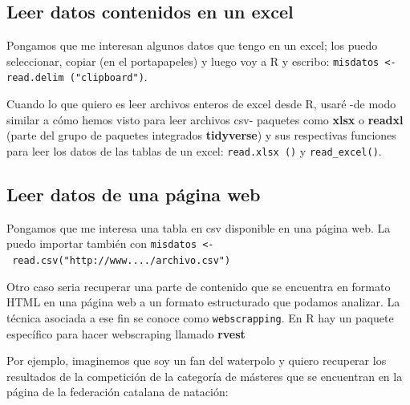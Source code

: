 \documentclass[]{book}
\newenvironment{Shaded}{\begin{snugshade}}{\end{snugshade}}
\newcommand{\KeywordTok}[1]{\textcolor[rgb]{0.13,0.29,0.53}{\textbf{{#1}}}}
\newcommand{\DecValTok}[1]{\textcolor[rgb]{0.00,0.00,0.81}{{#1}}}
\newcommand{\StringTok}[1]{\textcolor[rgb]{0.31,0.60,0.02}{{#1}}}
\newcommand{\CommentTok}[1]{\textcolor[rgb]{0.56,0.35,0.01}{\textit{{#1}}}}
\newcommand{\NormalTok}[1]{{#1}}
\theoremstyle{definition}
\theoremstyle{definition}
\theoremstyle{remark}
\begin{document}
\subsection{Leer datos contenidos en un
excel}\label{leer-datos-contenidos-en-un-excel}

Pongamos que me interesan algunos datos que tengo en un excel; los puedo
seleccionar, copiar (en el portapapeles) y luego voy a R y escribo:
\texttt{misdatos\ \textless{}-read.delim\ ("clipboard")}.

Cuando lo que quiero es leer archivos enteros de excel desde R, usaré
-de modo similar a cómo hemos visto para leer archivos csv- paquetes
como \textbf{xlsx} \citep{R-xlsx} o \textbf{readxl} \citep{R-readxl}
(parte del grupo de paquetes integrados \textbf{tidyverse}) y sus
respectivas funciones para leer los datos de las tablas de un excel:
\texttt{read.xlsx\ ()} y \texttt{read\_excel()}.

\subsection{Leer datos de una página
web}\label{leer-datos-de-una-pagina-web}

Pongamos que me interesa una tabla en csv disponible en una página web.
La puedo importar también con
\texttt{misdatos\ \textless{}-\ read.csv("http://www..../archivo.csv")}

Otro caso seria recuperar una parte de contenido que se encuentra en
formato HTML en una página web a un formato estructurado que podamos
analizar. La técnica asociada a ese fin se conoce como
\texttt{webscrapping}. En R hay un paquete específico para hacer
webscraping llamado \textbf{rvest} \citep{R-rvest}

Por ejemplo, imaginemos que soy un fan del waterpolo y quiero recuperar
los resultados de la competición de la categoría de másteres que se
encuentran en la página de la federación catalana de natación:

\begin{Shaded}
\end{Shaded}
\end{document}
